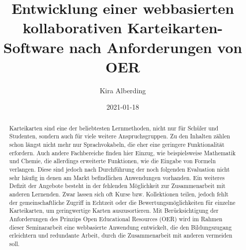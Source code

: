 \documentclass[
    disabletodonotes,         %
    language=german           %
  ]{dbisseminar}
\author{%
  Kira Alberding \email{k{\_}albe09@uni-muenster.de} %
}
\title{Entwicklung einer webbasierten kollaborativen Karteikarten-Software nach Anforderungen von OER}
\date{2021-01-18}
\begin{document}
  \maketitle

  \frontmatter


  \begin{abstract}
Karteikarten sind eine der beliebtesten Lernmethoden, nicht nur für Schüler und Studenten, sondern auch für viele weitere Anspruchsgruppen. Zu den Inhalten zählen schon längst nicht mehr nur Sprachvokabeln, die eher eine geringere Funktionalität erfordern. Auch andere Fachbereiche finden hier Einzug, wie beispielsweise Mathematik und Chemie, die allerdings erweiterte Funktionen, wie die Eingabe von Formeln verlangen. Diese sind jedoch nach Durchführung der noch folgenden Evaluation nicht sehr häufig in denen am Markt befindlichen Anwendungen vorhanden. Ein weiteres Defizit der Angebote besteht in der fehlenden Möglichkeit zur Zusammenarbeit mit anderen Lernenden. Zwar lassen sich oft Kurse bzw. Kollektionen teilen, jedoch fehlt der gemeinschaftliche Zugriff in Echtzeit oder die Bewertungsmöglichkeiten für einzelne Karteikarten, um geringwertige Karten auszusortieren. Mit Berücksichtigung der Anforderungen des Prinzips Open Educational Resources (OER) wird im Rahmen dieser Seminararbeit eine webbasierte Anwendung entwickelt, die den Bildungszugang erleichtern und redundante Arbeit, durch die Zusammenarbeit mit anderen vermeiden soll.
  \end{abstract}

  \tableofcontents
  \pagestyle{plain}
  \newpage
  \pagestyle{plain}

  \listofabbreviations
  \glsaddall
  \listofsymbols


  \mainmatter
  



  \newpage
\end{document}
